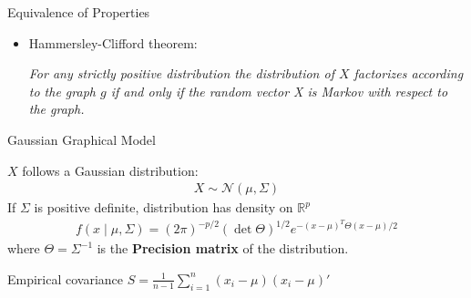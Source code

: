 \documentclass{beamer}
\begin{document}
\begin{frame}{Equivalence of Properties}
\begin{itemize}
	\item Hammersley-Clifford theorem: \begin{center}
		\textit{For any strictly positive distribution the distribution of $X$ factorizes according to the graph $g$ if and only if the random vector X is Markov with respect to the graph.} \cite{hastie2015statistical}
	\end{center}
\end{itemize}
\end{frame}


\begin{frame}{Gaussian Graphical Model}
\begin{center}
		\begin{tcolorbox}[width = 4.5in, boxsep = 0pt,
			left = 2pt, right = 2pt, top = 2pt]
			$X$ follows a Gaussian distribution:
			\begin{align*}
			X \sim \mathcal{N}(\mu, \Sigma)
			\end{align*}
			If $\Sigma$ is positive definite, distribution has density on $\mathbb{R}^{p}$
\begin{align*}
	f(x \mid \mu, \Sigma)=(2 \pi)^{-p / 2}(\operatorname{det} \Theta)^{1 / 2} e^{-(x-\mu)^{T} \Theta(x-\mu) / 2}
\end{align*}
where $\Theta=\Sigma^{-1}$ is the \textbf{Precision matrix} of the distribution.
		\end{tcolorbox}	
\end{center}

Empirical covariance $S = \frac{1}{n-1} \sum_{i=1}^{n}\left(x_{i}-\mu\right)\left(x_{i}-\mu\right)'$

\end{frame}
\end{document}
